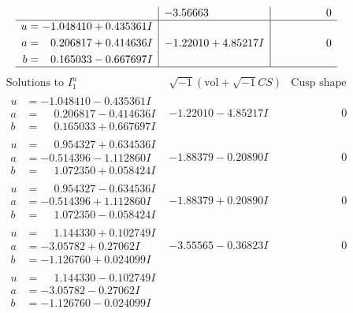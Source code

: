 \documentclass[1p]{elsarticle_modified}
\theoremstyle{definition}
\newcommand{\I}{\sqrt{-1}}
\begin{document}
$$\begin{array}{c|c|c}
 & -3.56663\phantom{ +0.000000I} & \phantom{-0.000000 } 0 \\ \hline\begin{aligned}
u &= -1.048410 + 0.435361 I \\
a &= \phantom{-}0.206817 + 0.414636 I \\
b &= \phantom{-}0.165033 - 0.667697 I\end{aligned}
 & -1.22010 + 4.85217 I & \phantom{-0.000000 } 0\\
 \hline 
 \end{array}$$\newpage$$\begin{array}{c|c|c}  
\text{Solutions to }I^u_{1}& \I (\text{vol} + \sqrt{-1}CS) & \text{Cusp shape}\\
 \hline 
\begin{aligned}
u &= -1.048410 - 0.435361 I \\
a &= \phantom{-}0.206817 - 0.414636 I \\
b &= \phantom{-}0.165033 + 0.667697 I\end{aligned}
 & -1.22010 - 4.85217 I & \phantom{-0.000000 } 0 \\ \hline\begin{aligned}
u &= \phantom{-}0.954327 + 0.634536 I \\
a &= -0.514396 - 1.112860 I \\
b &= \phantom{-}1.072350 + 0.058424 I\end{aligned}
 & -1.88379 - 0.20890 I & \phantom{-0.000000 } 0 \\ \hline\begin{aligned}
u &= \phantom{-}0.954327 - 0.634536 I \\
a &= -0.514396 + 1.112860 I \\
b &= \phantom{-}1.072350 - 0.058424 I\end{aligned}
 & -1.88379 + 0.20890 I & \phantom{-0.000000 } 0 \\ \hline\begin{aligned}
u &= \phantom{-}1.144330 + 0.102749 I \\
a &= -3.05782 + 0.27062 I \\
b &= -1.126760 + 0.024099 I\end{aligned}
 & -3.55565 - 0.36823 I & \phantom{-0.000000 } 0 \\ \hline\begin{aligned}
u &= \phantom{-}1.144330 - 0.102749 I \\
a &= -3.05782 - 0.27062 I \\
b &= -1.126760 - 0.024099 I\end{aligned}

\end{array}$$
\end{document}
